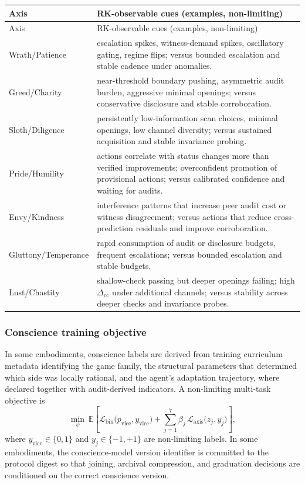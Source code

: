 \documentclass[a4paper,12pt]{article}
\begin{document}
\begingroup
\footnotesize
\begin{longtable}{@{}p{}p{}@{}}
\toprule
Axis & RK-observable cues (examples, non-limiting) \\
\midrule
\endfirsthead
\toprule
Axis & RK-observable cues (examples, non-limiting) \\
\midrule
\endhead
Wrath/\allowbreak Patience & escalation spikes, witness-demand spikes, oscillatory gating, regime flips; versus bounded escalation and stable cadence under anomalies. \\
Greed/\allowbreak Charity & near-threshold boundary pushing, asymmetric audit burden, aggressive minimal openings; versus conservative disclosure and stable corroboration. \\
Sloth/\allowbreak Diligence & persistently low-information scan choices, minimal openings, low channel diversity; versus sustained acquisition and stable invariance probing. \\
Pride/\allowbreak Humility & actions correlate with status changes more than verified improvements; overconfident promotion of provisional actions; versus calibrated confidence and waiting for audits. \\
Envy/\allowbreak Kindness & interference patterns that increase peer audit cost or witness disagreement; versus actions that reduce cross-prediction residuals and improve corroboration. \\
Gluttony/\allowbreak Temperance & rapid consumption of audit or disclosure budgets, frequent escalations; versus bounded escalation and stable budgets. \\
Lust/\allowbreak Chastity & shallow-check passing but deeper openings failing; high $\Delta_{\mathrm{cc}}$ under additional channels; versus stability across deeper checks and invariance probes. \\
\bottomrule
\end{longtable}
\endgroup

\subsubsection{Conscience training objective}
\label{sec:conscience-training}

In some embodiments, conscience labels are derived from training
curriculum metadata identifying the game family, the structural
parameters that determined which side was locally rational, and the
agent's adaptation trajectory, where declared together with audit-derived
indicators. A non-limiting multi-task objective is
\[
  \min_{\psi}\ \mathbb{E}\!\left[
    \mathcal{L}_{\mathrm{bin}}\bigl(p_{\mathrm{vice}}, y_{\mathrm{vice}}\bigr)
    +
    \sum_{j=1}^{7}
    \beta_j\,\mathcal{L}_{\mathrm{axis}}\bigl(z_j, y_j\bigr)
  \right],
\]
where $y_{\mathrm{vice}}\in\{0,1\}$ and $y_j\in\{-1,+1\}$ are
non-limiting labels. In some embodiments, the conscience-model version
identifier is committed to the protocol digest so that joining,
archival compression, and graduation decisions are conditioned on the
correct conscience version.
\end{document}
